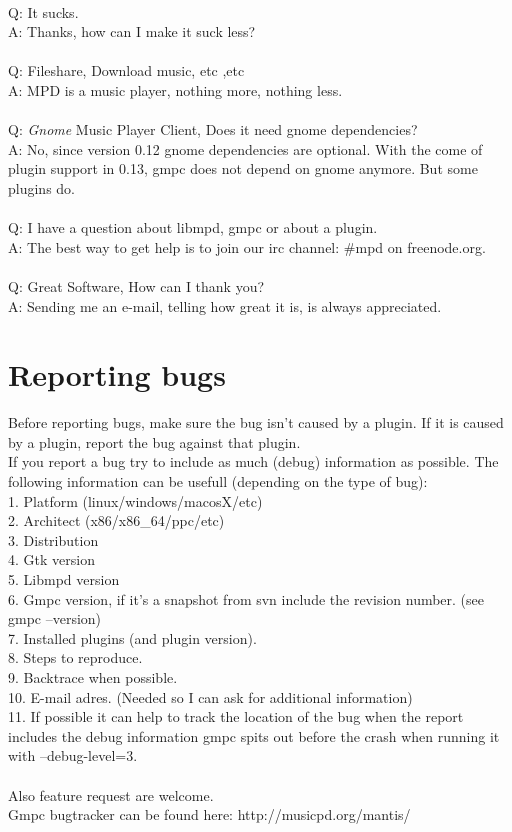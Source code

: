 \documentclass{article}
\begin{document}
\\
Q: It sucks.\\
A: Thanks, how can I make it suck less?\\
\\
Q: Fileshare, Download music, etc ,etc\\
A: MPD is a music player, nothing more, nothing less.\\
\\
Q: \emph{Gnome} Music Player Client, Does it need gnome dependencies?\\
A: No, since version 0.12 gnome dependencies are optional. With the come of plugin support in 0.13, gmpc does not depend on gnome anymore. But some plugins do.\\
\\
Q: I have a question about libmpd, gmpc or about a plugin.\\
A: The best way to get help is to join our irc channel: \#mpd on freenode.org.\\
\\
Q: Great Software, How can I thank you?\\
A: Sending me an e-mail, telling how great it is, is always appreciated.\\


\section{Reporting bugs}
Before reporting bugs, make sure the bug isn't caused by a plugin. If it is caused by a plugin, report the bug against that plugin.\\
If you report a bug try to include as much (debug) information as possible. The following information can be usefull (depending on the type of bug):\\
1. Platform (linux/windows/macosX/etc)\\
2. Architect (x86/x86\_64/ppc/etc)\\
3. Distribution\\
4. Gtk version\\
5. Libmpd version\\
6. Gmpc version, if it's a snapshot from svn include the revision number. (see gmpc --version)\\
7. Installed plugins (and plugin version).\\
8. Steps to reproduce.\\
9. Backtrace when possible.\\
10. E-mail adres. (Needed so I can ask for additional information)\\
11. If possible it can help to track the location of the bug when the report includes the debug information gmpc spits out before the crash when running it with --debug-level=3.\\
\\
Also feature request are welcome.\\
Gmpc bugtracker can be found here: http://musicpd.org/mantis/\\
\end{document}
